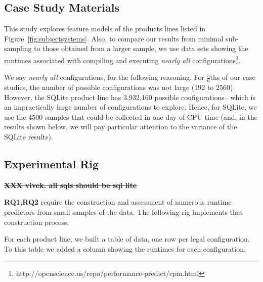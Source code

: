 \documentclass{sig-alternative}
\newcommand{\fig}[1]{Figure~\ref{fig:#1}}
\begin{document}
\subsection{Case Study Materials}

This study explores feature models of the products lines listed in \fig{subjectsystems}.
Also, to compare our results from minimal sub-sampling to those obtained 
from a larger sample, we use data sets showing the runtimes associated with
compiling and executing {\em nearly all} configurations\footnote{http://openscience.us/repo/performance-predict/cpm.html}.

We say {\em nearly all} configurations, for the following reasoning. For 
$\frac{5}{6}$ths of our case studies, the number of possible configurations
was not large (192 to 2560). However, the SQLite product line has 3,932,160 
possible configurations-- which is an impractically large number of configurations to explore. Hence, for SQLite, we use the 4500 samples that could
be collected in one day of CPU time (and, in the results shown below,
we will pay particular attention to the variance of the SQLite results).

\subsection{Experimental Rig}

{\st{\bf XXX vivek. all sqls should be sql lite}}


 



{\bf RQ1,RQ2} require the construction and assessment of numerous runtime predictors from small samples
of the data. The following rig implements that construction process.

For each product line, we built a table of data, one row per legal configuration.
To this table we added a column showing the runtimes for each configuration.
\end{document}

